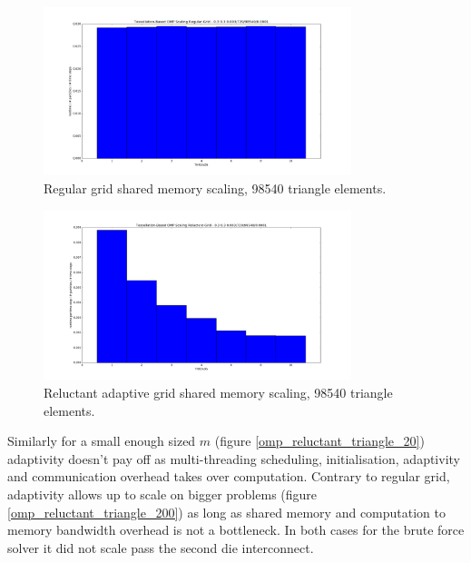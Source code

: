 \begin{figure}[htb]
  \begin{center}
    \includegraphics[width=0.8\textwidth]{experiments/omp/omp_mesh_regular_200.png}
  \end{center}
  \caption{Regular grid shared memory scaling, 98540 triangle elements.}
  \label{figure:omp_regular_triangle_200}
\end{figure}

\begin{figure}[htb]
  \begin{center}
    \includegraphics[width=0.8\textwidth]{experiments/omp/omp_mesh_reluctant_200.png}
  \end{center}
  \caption{Reluctant adaptive grid shared memory scaling, 98540 triangle elements.}
  \label{figure:omp_reluctant_triangle_200}
\end{figure}

Similarly for a small enough sized $m$ (figure \ref{omp_reluctant_triangle_20}) adaptivity doesn't pay off as multi-threading scheduling, initialisation, adaptivity and communication overhead takes over computation. Contrary to regular grid, adaptivity allows up to scale on bigger problems (figure \ref{omp_reluctant_triangle_200}) as long as shared memory and computation to memory bandwidth overhead is not a bottleneck. In both cases for the brute force solver it did not scale pass the second die interconnect.


